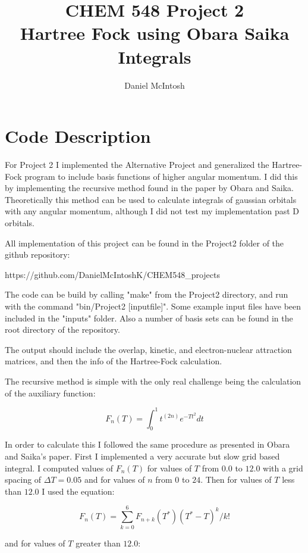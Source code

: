 \documentclass{article}
\title{CHEM 548 Project 2\\Hartree Fock using Obara Saika Integrals}
\author{Daniel McIntosh}
\begin{document}
\maketitle

\section{Code Description}

For Project 2 I implemented the Alternative Project and generalized the Hartree-Fock program to include basis functions of higher angular momentum. I did this by implementing the recursive method found in the paper by Obara and Saika. Theoretically this method can be used to calculate integrals of gaussian orbitals with any angular momentum, although I did not test my implementation past D orbitals.

All implementation of this project can be found in the Project2 folder of the github repository:

https://github.com/DanielMcIntoshK/CHEM548\_projects

The code can be build by calling "make" from the Project2 directory, and run with the command "bin/Project2 [inputfile]". Some example input files have been included in the "inputs" folder. Also a number of basis sets can be found in the root directory of the repository. 

The output should include the overlap, kinetic, and electron-nuclear attraction matrices, and then the info of the Hartree-Fock calculation.

The recursive method is simple with the only real challenge being the calculation of the auxiliary function:

\begin{equation}
F_n(T)=\int_0^1 t^{(2n)} e^{-T t^2}dt
\end{equation}

In order to calculate this I followed the same procedure as presented in Obara and Saika's paper. First I implemented a very accurate but slow grid based integral. I computed values of $F_n(T)$ for values of $T$ from $0.0$ to $12.0$ with a grid spacing of $\Delta T=0.05$ and for values of $n$ from $0$ to $24$. Then for values of $T$ less than $12.0$ I used the equation:

\begin{equation}
F_n(T)=\sum_{k=0}^6 F_{n+k}(T^*)(T^*-T)^k/k!
\end{equation}

and for values of $T$ greater than $12.0$:
\end{document}

